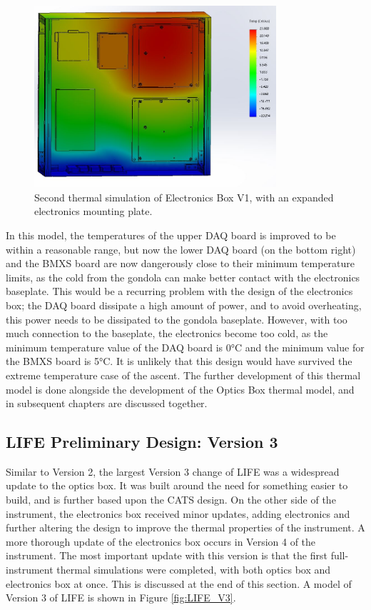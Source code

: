 \begin{figure}
    \centering
    \includegraphics[width=0.8\textwidth]{chap3_images/LIFE_V2_images/TA_-20_expanded_centre_plate.JPG}
    \caption{Second thermal simulation of Electronics Box V1, with an expanded electronics mounting plate.}
    \label{fig:EBOX_V1_TA_2_BIGGERCENTRE}
\end{figure}

In this model, the temperatures of the upper DAQ board is improved to be within a reasonable range, but now the lower DAQ board (on the bottom right) and the BMXS board are now dangerously close to their minimum temperature limits, as the cold from the gondola can make better contact with the electronics baseplate. This would be a recurring problem with the design of the electronics box; the DAQ board dissipate a high amount of power, and to avoid overheating, this power needs to be dissipated to the gondola baseplate. However, with too much connection to the baseplate, the electronics become too cold, as the minimum temperature value of the DAQ board is 0°C and the minimum value for the BMXS board is 5°C. It is unlikely that this design would have survived the extreme temperature case of the ascent. The further development of this thermal model is done alongside the development of the Optics Box thermal model, and in subsequent chapters are discussed together. 

\subsection{LIFE Preliminary Design: Version 3}

Similar to Version 2, the largest Version 3 change of LIFE was a widespread update to the optics box. It was built around the need for something easier to build, and is further based upon the CATS design. On the other side of the instrument, the electronics box received minor updates, adding electronics and further altering the design to improve the thermal properties of the instrument. A more thorough update of the electronics box occurs in Version 4 of the instrument. The most important update with this version is that the first full-instrument thermal simulations were completed, with both optics box and electronics box at once. This is discussed at the end of this section. A model of Version 3 of LIFE is shown in Figure \ref{fig:LIFE_V3}.

